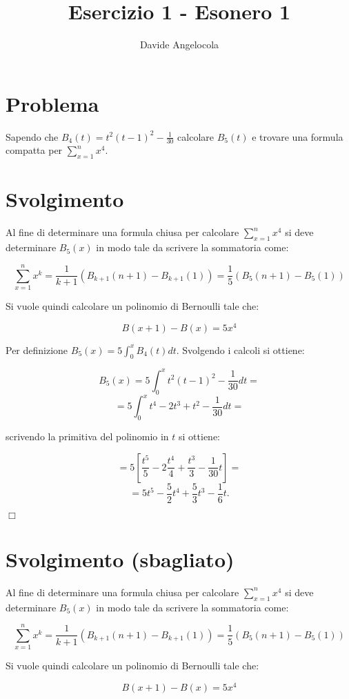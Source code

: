 \documentclass{article}
\title{Esercizio 1 - Esonero 1}
\author{Davide Angelocola}
\begin{document}
\maketitle

\section{Problema}

Sapendo che $B_4(t) = t^2(t-1)^2 - \frac{1}{30}$ calcolare $B_5(t)$ e trovare una formula compatta per $\sum_{x=1}^{n}{x^4}$.

\section{Svolgimento}

Al fine di determinare una formula chiusa per calcolare $\sum_{x=1}^{n}{x^4}$ si
deve determinare $B_5(x)$ in modo tale da scrivere la sommatoria come:

$$\sum_{x=1}^{n}{x^k} = \frac{1}{k+1} (B_{k+1}(n+1) - B_{k+1}(1))=\frac{1}{5} (B_5(n+1) - B_5(1)) $$\label{1}

Si vuole quindi calcolare un polinomio di Bernoulli tale che:

$$B(x+1) - B(x) = 5x^4$$

Per definizione $B_5(x) = 5\int_0^x{B_4(t)dt}$. Svolgendo i calcoli si ottiene:

$$B_5(x) = 5\int_0^x{t^2(t-1)^2-\frac{1}{30}dt}=$$
$$=5\int_0^x{t^4-2t^3+t^2-\frac{1}{30}dt}=$$

scrivendo la primitiva del polinomio in $t$ si ottiene:

$$=5[\frac{t^5}{5}-2\frac{t^4}{4}+\frac{t^3}{3}-\frac{1}{30}t]=$$
$$=5t^5-\frac{5}{2}t^4+\frac{5}{3}t^3-\frac{1}{6}t.$$

$\Box$

\section{Svolgimento (sbagliato)}

Al fine di determinare una formula chiusa per calcolare $\sum_{x=1}^{n}{x^4}$ si
deve determinare $B_5(x)$ in modo tale da scrivere la sommatoria come:

$$\sum_{x=1}^{n}{x^k} = \frac{1}{k+1} (B_{k+1}(n+1) - B_{k+1}(1))=\frac{1}{5} (B_5(n+1) - B_5(1)) $$\label{1}

Si vuole quindi calcolare un polinomio di Bernoulli tale che:

$$B(x+1) - B(x) = 5x^4$$
\end{document}
